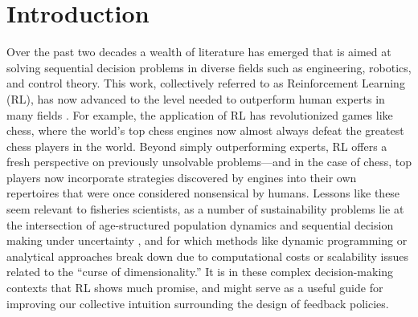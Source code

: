 \documentclass[floatfix,nofootinbib,longbibliography,notitlepage]{revtex4-1}
\begin{document}
\maketitle

\tableofcontents
\makeatletter
\let\toc@pre\relax
\let\toc@post\relax
\makeatother 

%
%
%
\section{Introduction}

Over the past two decades a wealth of literature has emerged that is aimed at solving sequential decision problems in diverse fields such as engineering, robotics, and control theory.  
This work, collectively referred to as Reinforcement Learning (RL), has now advanced to the level needed to outperform human experts in many fields \cite{sutton-rl,bertsekas-rl}.  
For example, the application of RL has revolutionized games like chess, where the world’s top chess engines now almost always defeat the greatest chess players in the world. 
Beyond simply outperforming experts, RL offers a fresh perspective on previously unsolvable problems—and in the case of chess, top players now incorporate strategies discovered by engines into their own repertoires that were once considered nonsensical by humans. 
Lessons like these seem relevant to fisheries scientists, as a number of sustainability problems lie at the intersection of age-structured population dynamics and sequential decision making under uncertainty \cite{walters-hilborn-1978}, and for which methods like dynamic programming or analytical approaches break down due to computational costs or scalability issues related to the “curse of dimensionality.”  
It is in these complex decision-making contexts that RL shows much promise, and might serve as a useful guide for improving our collective intuition surrounding the design of feedback policies.
\end{document}
